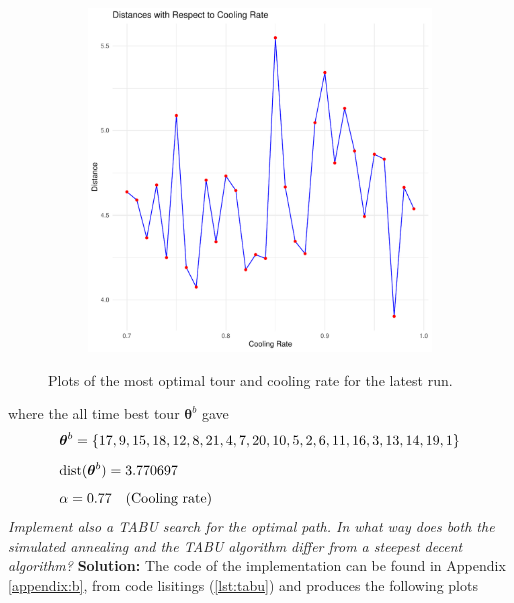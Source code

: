 \begin{figure}[H]
\begin{subfigure}{0.48\textwidth}
    \includegraphics[width=\linewidth]{Images/Figures_Exercise_4/opt_cooling.pdf} %
    \caption{}
    \label{fig:opt_cooling}
  \end{subfigure}
  \caption{Plots of the most optimal tour and cooling rate for the latest run.}
  \label{fig:annealing_plots}
\end{figure}
where the all time best tour $\boldsymbol{\theta}^{b}$ gave
\begin{align*}
    &\boldsymbol{\theta}^{b} = \left\{ 17, 9, 15, 18, 12, 8, 21, 4, 7, 20, 10, 5, 2, 6, 11, 16, 3, 13, 14, 19, 1 \right\} \\[5pt] 
    &\text{dist}( \boldsymbol{\theta}^{b}) =  3.770697 \\[5pt]
    &\alpha = 0.77 \quad \text{(Cooling rate)}
\end{align*}
\emph{Implement also a TABU search for the optimal path. In what way does both the simulated annealing and the TABU algorithm differ from a steepest decent algorithm?} \spaze 
\textbf{Solution:} \spaze
The code of the implementation can be found in Appendix \ref{appendix:b}, from code lisitings (\ref{lst:tabu}) and produces the following plots 
